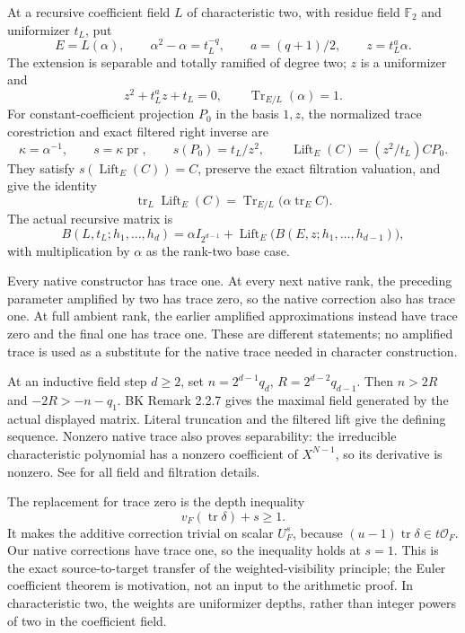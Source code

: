 At a recursive coefficient field \(L\) of characteristic two, with
residue field \(\mathbb F_2\) and uniformizer \(t_L\), put \[
E=L(\alpha),\qquad \alpha^2-\alpha=t_L^{-q},\qquad
a=(q+1)/2,\qquad z=t_L^a\alpha.
\] The extension is separable and totally ramified of degree two; \(z\)
is a uniformizer and \[
z^2+t_L^az+t_L=0,\qquad \operatorname{Tr}_{E/L}(\alpha)=1.
\] For constant-coefficient projection \(P_0\) in the basis \(1,z\), the
normalized trace corestriction and exact filtered right inverse are \[
\kappa=\alpha^{-1},\qquad s=\kappa\operatorname{pr},\qquad
s(P_0)=t_L/z^2,\qquad
\operatorname{Lift}_E(C)=(z^2/t_L)CP_0.
\] They satisfy \(s(\operatorname{Lift}_E(C))=C\), preserve the exact
filtration valuation, and give the identity \[
\operatorname{tr}_L\operatorname{Lift}_E(C)
 =\operatorname{Tr}_{E/L}
   \bigl(\alpha\operatorname{tr}_E C\bigr).
\] The actual recursive matrix is \[
B(L,t_L;h_1,\ldots,h_d)
 =\alpha I_{2^{d-1}}+
   \operatorname{Lift}_E\bigl(B(E,z;h_1,\ldots,h_{d-1})\bigr),
\] with multiplication by \(\alpha\) as the rank-two base case.

Every native constructor has trace one. At every next native rank, the
preceding parameter amplified by two has trace zero, so the native
correction also has trace one. At full ambient rank, the earlier
amplified approximations instead have trace zero and the final one has
trace one. These are different statements; no amplified trace is used as
a substitute for the native trace needed in character construction.

At an inductive field step \(d\ge2\), set \(n=2^{d-1}q_d\),
\(R=2^{d-2}q_{d-1}\). Then \(n>2R\) and \(-2R>-n-q_1\). BK Remark 2.2.7
gives the maximal field generated by the actual displayed matrix.
Literal truncation and the filtered lift give the defining sequence.
Nonzero native trace also proves separability: the irreducible
characteristic polynomial has a nonzero coefficient of \(X^{N-1}\), so
its derivative is nonzero. See 
for all field and filtration details.

The replacement for trace zero is the depth inequality \[
\boxed{v_F(\operatorname{tr}\delta)+s\ge1.}
\] It makes the additive correction trivial on scalar \(U_F^s\), because
\((u-1)\operatorname{tr}\delta\in t\mathcal O_F\). Our native
corrections have trace one, so the inequality holds at \(s=1\). This is
the exact source-to-target transfer of the weighted-visibility
principle; the Euler coefficient theorem is motivation, not an input to
the arithmetic proof. In characteristic two, the weights are uniformizer
depths, rather than integer powers of two in the coefficient field.

